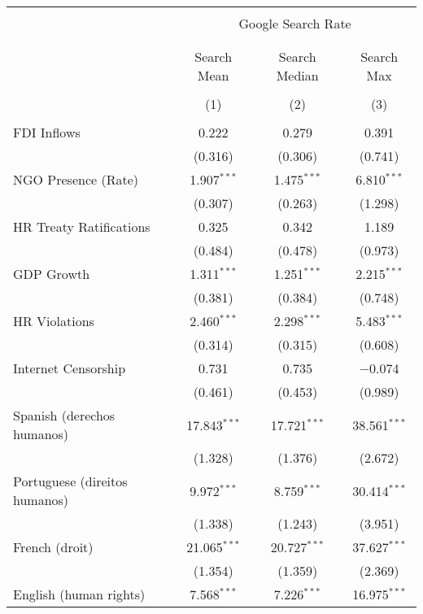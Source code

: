 
\begin{table}[!htbp] \centering 
  \caption{} 
  \label{} 
\begin{tabular}{@{\extracolsep{5pt}}lccc} 
\\[-1.8ex]\hline 
\hline \\[-1.8ex] 
 & \multicolumn{3}{c}{Google Search Rate} \\ 
\cline{2-4} 
\\[-1.8ex] & \multicolumn{3}{c}{ } \\ 
 & Search Mean & Search Median & Search Max \\ 
\\[-1.8ex] & (1) & (2) & (3)\\ 
\hline \\[-1.8ex] 
 FDI Inflows & 0.222 & 0.279 & 0.391 \\ 
  & (0.316) & (0.306) & (0.741) \\ 
  NGO Presence (Rate) & 1.907$^{***}$ & 1.475$^{***}$ & 6.810$^{***}$ \\ 
  & (0.307) & (0.263) & (1.298) \\ 
  HR Treaty Ratifications & 0.325 & 0.342 & 1.189 \\ 
  & (0.484) & (0.478) & (0.973) \\ 
  GDP Growth & 1.311$^{***}$ & 1.251$^{***}$ & 2.215$^{***}$ \\ 
  & (0.381) & (0.384) & (0.748) \\ 
  HR Violations & 2.460$^{***}$ & 2.298$^{***}$ & 5.483$^{***}$ \\ 
  & (0.314) & (0.315) & (0.608) \\ 
  Internet Censorship & 0.731 & 0.735 & $-$0.074 \\ 
  & (0.461) & (0.453) & (0.989) \\ 
  Spanish (derechos humanos) & 17.843$^{***}$ & 17.721$^{***}$ & 38.561$^{***}$ \\ 
  & (1.328) & (1.376) & (2.672) \\ 
  Portuguese (direitos humanos) & 9.972$^{***}$ & 8.759$^{***}$ & 30.414$^{***}$ \\ 
  & (1.338) & (1.243) & (3.951) \\ 
  French (droit) & 21.065$^{***}$ & 20.727$^{***}$ & 37.627$^{***}$ \\ 
  & (1.354) & (1.359) & (2.369) \\ 
  English (human rights) & 7.568$^{***}$ & 7.226$^{***}$ & 16.975$^{***}$ \\ 

\end{tabular}
\end{table}
